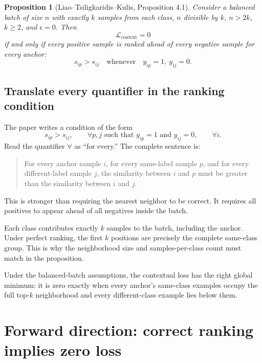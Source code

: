 \documentclass[11pt,oneside,openany]{book}
\theoremstyle{myplain}
\newtheorem{proposition}{Proposition}[chapter]
\theoremstyle{definition}
\begin{document}
\begin{proposition}[Liao--Tsiligkaridis--Kulis, Proposition 4.1]
Consider a balanced batch of size $n$ with exactly $k$ samples from each class, $n$ divisible by $k$, $n>2k$, $k\ge2$, and $\epsilon=0$. Then
\[
\mathcal L_{\mathrm{context}}=0
\]
if and only if every positive sample is ranked ahead of every negative sample for every anchor:
\[
  s_{ip}>s_{ij}
  \quad\text{whenever}\quad y_{ip}=1,\ y_{ij}=0.
\]
\end{proposition}

\subsection{Translate every quantifier in the ranking condition}

The paper writes a condition of the form
\[
  s_{ip}>s_{ij},
  \qquad
  \forall p,j\text{ such that }y_{ip}=1\text{ and }y_{ij}=0,
  \qquad
  \forall i.
\]
Read the quantifier $\forall$ as ``for every.'' The complete sentence is:

\begin{quote}
For every anchor sample $i$, for every same-label sample $p$, and for every different-label sample $j$, the similarity between $i$ and $p$ must be greater than the similarity between $i$ and $j$.
\end{quote}

This is stronger than requiring the nearest neighbor to be correct. It requires all positives to appear ahead of all negatives inside the batch.

\begin{conceptbox}[title=Why counting the anchor itself matters]
Each class contributes exactly $k$ samples to the batch, including the anchor. Under perfect ranking, the first $k$ positions are precisely the complete same-class group. This is why the neighborhood size and samples-per-class count must match in the proposition.
\end{conceptbox}


\begin{conceptbox}[title=Plain-language translation]
Under the balanced-batch assumptions, the contextual loss has the right global minimum: it is zero exactly when every anchor's same-class examples occupy the full top-$k$ neighborhood and every different-class example lies below them.
\end{conceptbox}

\section{Forward direction: correct ranking implies zero loss}
\end{document}
